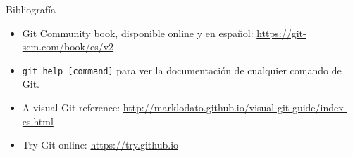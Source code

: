 \begin{frame}[t]{Bibliografía}

    \begin{itemize}
        \item Git Community book, disponible online y en español: \url{https://git-scm.com/book/es/v2}
		\item \texttt{git help [command]} para ver la documentación de cualquier comando de Git.
		\item A visual Git reference: \url{http://marklodato.github.io/visual-git-guide/index-es.html}
		\item Try Git online: \url{https://try.github.io}
    \end{itemize}

\end{frame}
